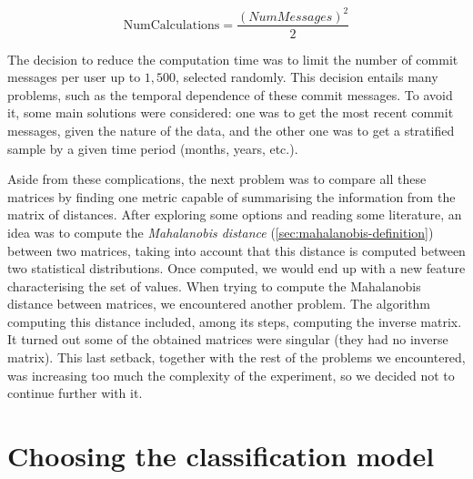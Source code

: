 \documentclass[a4paper, 12pt]{book}
\begin{document}
\begin{center}
    \begin{equation}
    \mathrm{NumCalculations} = \frac{( NumMessages )^2}{2}
    \end{equation}
\end{center}

The decision to reduce the computation time was to limit the number of commit messages per user up to $1,500$, selected randomly. This decision entails many problems, such as the temporal dependence of these commit messages. To avoid it, some main solutions were considered: one was to get the most recent commit messages, given the nature of the data, and the other one was to get a stratified sample by a given time period (months, years, etc.).

Aside from these complications, the next problem was to compare all these matrices by finding one metric capable of summarising the information from the matrix of distances. After exploring some options and reading some literature, an idea was to compute the \textit{Mahalanobis distance} (\ref{sec:mahalanobis-definition}) between two matrices, taking into account that this distance is computed between two statistical distributions. Once computed, we would end up with a new feature characterising the set of values. When trying to compute the Mahalanobis distance between matrices, we encountered another problem. The algorithm computing this distance included, among its steps, computing the inverse matrix. It turned out some of the obtained matrices were singular (they had no inverse matrix). This last setback, together with the rest of the problems we encountered, was increasing too much the complexity of the experiment, so we decided not to continue further with it.

\section{Choosing the classification model} 
\label{sec:exp-classification-models}

\end{document}
